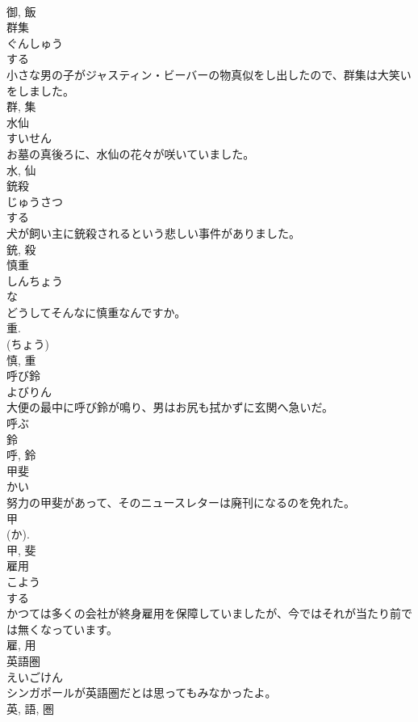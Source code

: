 \documentclass[8pt]{extreport}
\begin{document}
\begin{CJK}{UTF8}{min}
\\	御, 飯	
\\	群集	
\\	ぐんしゅう	
\\	する 
\\	小さな男の子がジャスティン・ビーバーの物真似をし出したので、群集は大笑いをしました。	
\\	群, 集	
\\	水仙	
\\	すいせん	
\\	お墓の真後ろに、水仙の花々が咲いていました。	
\\	水, 仙	
\\	銃殺	
\\	じゅうさつ	
\\	する 
\\	犬が飼い主に銃殺されるという悲しい事件がありました。	
\\	銃, 殺	
\\	慎重	
\\	しんちょう	
\\	な 
\\	どうしてそんなに慎重なんですか。	
\\	重. 
\\	(ちょう)
\\	慎, 重	
\\	呼び鈴	
\\	よびりん	
\\	大便の最中に呼び鈴が鳴り、男はお尻も拭かずに玄関へ急いだ。	
\\	呼ぶ 
\\	鈴
\\	呼, 鈴	
\\	甲斐	
\\	かい	
\\	努力の甲斐があって、そのニュースレターは廃刊になるのを免れた。	
\\	甲 
\\	(か). 
\\	甲, 斐	
\\	雇用	
\\	こよう	
\\	する 
\\	かつては多くの会社が終身雇用を保障していましたが、今ではそれが当たり前では無くなっています。	
\\	雇, 用	
\\	英語圏	
\\	えいごけん	
\\	シンガポールが英語圏だとは思ってもみなかったよ。	
\\	英, 語, 圏	

\end{CJK}
\end{document}
